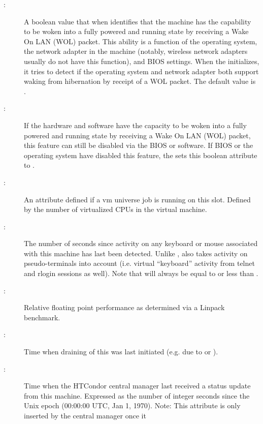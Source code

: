 \begin{description}
\item[:] A boolean value that when  identifies
that the machine has the capability to be woken into a 
fully powered and running state by receiving a Wake On LAN (WOL) packet.
This ability is a function of the operating system, 
the network adapter in the machine 
(notably, wireless network adapters usually do not have this function),
and BIOS settings. 
When the  initializes, 
it tries to detect if the operating system and network adapter both support 
waking from hibernation by receipt of a WOL packet.
The default value is .
%
\item[:] If the hardware and software have the capacity 
to be woken into a fully powered and running state by receiving 
a Wake On LAN (WOL) packet,
this feature can still be disabled via the BIOS or software.
If BIOS or the operating system have disabled this feature, 
the  sets this boolean attribute to .
%
\item[:] An attribute defined if a vm universe job
is running on this slot.  Defined by the number of virtualized CPUs
in the virtual machine.
%
\item[:] The number of seconds since activity on any
keyboard or mouse associated with this machine has last been detected.
Unlike ,  also takes activity 
on pseudo-terminals into
account (i.e. virtual ``keyboard'' activity from telnet and rlogin
sessions as well).  Note that  will always be equal to or
less than .
%
\item[:] Relative floating point performance as determined via a
Linpack benchmark.
%
\item[:] Time when draining of this
 was last initiated (e.g. due to  or
).
%
\item[:] Time when the HTCondor central manager last
received a status update from this machine.  
Expressed as 
the number of integer seconds since the Unix epoch (00:00:00 UTC, Jan 1, 1970).
Note: This attribute is only inserted by the central manager once it

\end{description}
